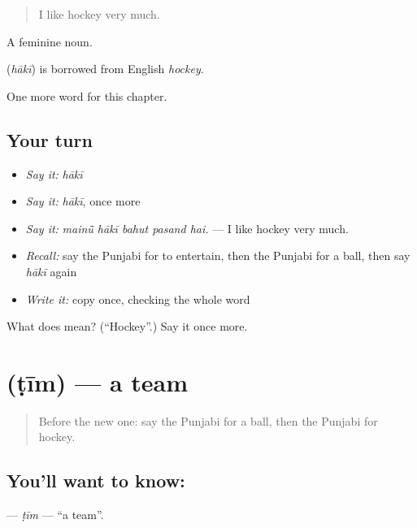 \begin{quote}
I like hockey very much.
\end{quote}

A feminine noun.

\begin{cousinweb}
\textbf{} (\emph{hākī}) is borrowed from English \emph{hockey}.
\end{cousinweb}

\begin{grammarlens}[title={What you've built}]
One more word for this chapter.
\end{grammarlens}

\subsection*{Your turn}
\begin{itemize}
\raggedright
  \item \emph{Say it:} \emph{hākī}
  \item \emph{Say it:} \emph{hākī}, once more
  \item \emph{Say it:} \emph{mainū̃ hākī bahut pasand hai.} — I like hockey very much.
  \item \emph{Recall:} say the Punjabi for to entertain, then the Punjabi for a ball, then say \emph{hākī} again
  \item \emph{Write it:} copy \textbf{} once, checking the whole word
\end{itemize}

\begin{tcolorbox}[breakable,colback=teal!4,colframe=teal!35!black,title={Before you move on}]
What does  mean? (\textquotedblleft{}Hockey\textquotedblright{}.) Say it once more.
\end{tcolorbox}
\section[\texorpdfstring{\pa{ਟੀਮ} (ṭīm)}{ਟੀਮ (ṭīm)}]{ (ṭīm) — a team}

\label{lesson:PA-C351-tim}



\begin{quote}
Before the new one: say the Punjabi for a ball, then the Punjabi for hockey.
\end{quote}

\subsection*{You'll want to know: }
\textbf{} — \emph{ṭīm} — \textquotedblleft{}a team\textquotedblright{}.

